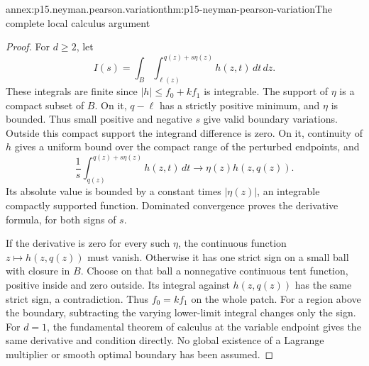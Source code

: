 \begin{annexitem}{annex:p15.neyman.pearson.variation}{thm:p15-neyman-pearson-variation}{The complete local calculus argument}
\begin{proof}
For \(d\geq2\), let
\[
 I(s)=\int_B\int_{\ell(z)}^{q(z)+s\eta(z)}h(z,t)\,dt\,dz.
\]
These integrals are finite since
\(|h|\leq f_0+kf_1\) is integrable.
The support of \(\eta\) is a compact
subset of \(B\). On it, \(q-\ell\)
has a strictly positive minimum,
and \(\eta\) is bounded.
Thus small positive and negative
\(s\) give valid boundary variations.
Outside this compact support the
integrand difference is zero.
On it, continuity of \(h\) gives a
uniform bound over the compact range
of the perturbed endpoints, and
\[
 \frac1s\int_{q(z)}^{q(z)+s\eta(z)}h(z,t)\,dt
                  \longrightarrow\eta(z)h(z,q(z)).
\]
Its absolute value is bounded by a
constant times \(|\eta(z)|\), an
integrable compactly supported function.
Dominated convergence proves the
derivative formula, for both signs
of \(s\).

If the derivative is zero for every
such \(\eta\), the continuous function
\(z\mapsto h(z,q(z))\) must vanish.
Otherwise it has one strict sign on
a small ball with closure in \(B\).
Choose on that ball a nonnegative
continuous tent function, positive
inside and zero outside.
Its integral against \(h(z,q(z))\)
has the same strict sign, a contradiction.
Thus \(f_0=kf_1\) on the whole patch.
For a region above the boundary,
subtracting the varying lower-limit
integral changes only the sign.
For \(d=1\), the fundamental theorem
of calculus at the variable endpoint
gives the same derivative and condition
directly. No global existence of a
Lagrange multiplier or smooth optimal
boundary has been assumed.
\end{proof}
\end{annexitem}

